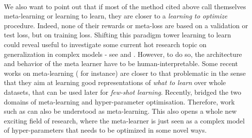 {{	\paragraph{}We also want to point out that if most of the method cited above call themselves meta-learning or learning to learn, they are closer to a \emph{learning to optimize} procedure. Indeed, none of their rewards or meta-loss are based on a validation or test loss, but on training loss. Shifting this paradigm tower learning to learn could reveal useful to investigate some current hot research topic on generalization in complex models - see \cite{keskar2016large} and \cite{dinh2017sharp}. However, to do so, the architecture and behavior of the meta learner have to be human-interpretable. Some recent works on meta-learning (\cite{ravi2016optimization} for instance) are closer to that problematic in the sense that they aim at learning good representations of \emph{what to learn} over whole datasets, that can be used later for \emph{few-shot learning}. 
	Recently, \cite{franceschi2017bridge} bridged the two domains of meta-learning and hyper-parameter optimisation. Therefore, work such as \cite{maclaurin2015gradient} can also be understood as meta-learning. This also opens a whole new exciting field of research, where the meta-learner is just seen as a complex model of hyper-parameters that needs to be optimized in some novel ways. 
		}
	}

